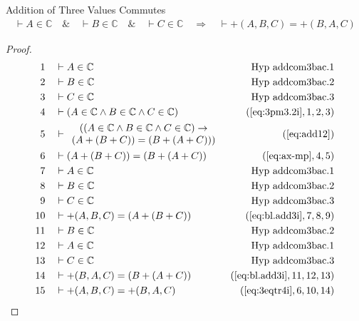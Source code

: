 \begin{lemma} {Addition of Three Values Commutes}
\begin{align}
\vdash A \in \mathbb{C}\quad\&\quad \vdash B \in \mathbb{C}\quad\&\quad \vdash
    C \in \mathbb{C}\quad\Rightarrow\quad \vdash +( A , B , C ) = +( B , A , C
    )\label{eq:bl.addcom3bac}\tag{bl.addcom3bac}
\end{align}
\end{lemma}


\begin{proof}
\begin{align}
  1 &&  & \vdash A \in \mathbb{C}&\text{Hyp~addcom3bac.1}\notag%
  \\ 2 &&  & \vdash B \in
\mathbb{C}&\text{Hyp~addcom3bac.2}\notag%
  \\ 3 &&  & \vdash C \in
\mathbb{C}&\text{Hyp~addcom3bac.3}\notag%
  \\ 4 &&  & \vdash ( A \in \mathbb{C} \wedge B \in \mathbb{C} \wedge C \in
     \mathbb{C} )&(\mbox{\ref{eq:3pm3.2i}},1,2,3)\notag
  \\ 5 &&  & \vdash 
    \begin{array}{c}
     ( ( A \in \mathbb{C} \wedge B \in \mathbb{C} \wedge C \in
     \mathbb{C} ) \rightarrow \\ ( A + ( B + C ) ) = ( B + (
     A + C ) ) )
      \end{array}
    &(\mbox{\ref{eq:add12}})\notag
  \\ 6 &&  & \vdash ( A + ( B + C ) ) = ( B + ( A + C )
     )     &(\mbox{\ref{eq:ax-mp}},4,5)\notag
  \\ 7 &&  & \vdash A \in
\mathbb{C}&\text{Hyp~addcom3bac.1}\notag%
  \\ 8 &&  & \vdash B \in
\mathbb{C}&\text{Hyp~addcom3bac.2}\notag%
  \\ 9 &&  & \vdash C \in
\mathbb{C}&\text{Hyp~addcom3bac.3}\notag%
  \\ 10 &&  & \vdash +( A , B , C ) = ( A + ( B + C )
     )&(\mbox{\ref{eq:bl.add3i}},7,8,9)\notag
  \\ 11 &&  & \vdash B \in
\mathbb{C}&\text{Hyp~addcom3bac.2}\notag%
  \\ 12 &&  & \vdash A \in
\mathbb{C}&\text{Hyp~addcom3bac.1}\notag%
  \\ 13 &&  & \vdash C \in
\mathbb{C}&\text{Hyp~addcom3bac.3}\notag%
  \\ 14 &&  & \vdash +( B , A , C ) = ( B + ( A + C )
     )&(\mbox{\ref{eq:bl.add3i}},11,12,13)\notag
  \\ 15 &&  & \vdash +( A , B , C ) = +( B , A , C
     )&(\mbox{\ref{eq:3eqtr4i}},6,10,14)\notag
\end{align}
\end{proof}

